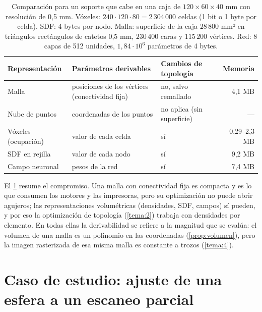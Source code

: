 \begin{table}[h]
\centering\small
\begin{tabularx}{\textwidth}{@{}l>{\raggedright\arraybackslash}X>{\raggedright\arraybackslash}Xr@{}}
\toprule
Representación & Parámetros derivables & Cambios de topología & Memoria \\
\midrule
Malla & posiciones de los vértices (conectividad fija) & no, salvo remallado & 4,1 MB \\
Nube de puntos & coordenadas de los puntos & no aplica (sin superficie) & --- \\
Vóxeles (ocupación) & valor de cada celda & sí & 0,29--2,3 MB \\
SDF en rejilla & valor de cada nodo & sí & 9,2 MB \\
Campo neuronal & pesos de la red & sí & 7,4 MB \\
\bottomrule
\end{tabularx}
\caption{Comparación para un soporte que cabe en una caja de $120\times 60\times 40$ mm con resolución de 0,5 mm. Vóxeles: $240\cdot 120\cdot 80=2\,304\,000$ celdas (1 bit o 1 byte por celda). SDF: 4 bytes por nodo. Malla: superficie de la caja $28\,800$ mm² en triángulos rectángulos de catetos 0,5 mm, $230\,400$ caras y $115\,200$ vértices. Red: 8 capas de 512 unidades, $1{,}84\cdot 10^{6}$ parámetros de 4 bytes.}
\label{tab:repr}
\end{table}

El \cref{tab:repr} resume el compromiso. Una malla con conectividad fija es compacta y es lo que consumen los motores y las impresoras, pero su optimización no puede abrir agujeros; las representaciones volumétricas (densidades, SDF, campos) sí pueden, y por eso la optimización de topología (\cref{tema:2}) trabaja con densidades por elemento. En todas ellas la derivabilidad se refiere a la magnitud que se evalúa: el volumen de una malla es un polinomio en las coordenadas (\cref{prop:volumen}), pero la imagen rasterizada de esa misma malla es constante a trozos (\cref{tema:4}).

\section{Caso de estudio: ajuste de una esfera a un escaneo parcial}

